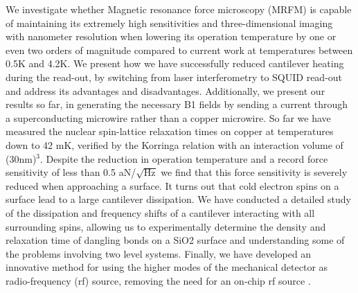 We investigate whether Magnetic resonance force microscopy (MRFM) is capable of maintaining its extremely high sensitivities and three-dimensional imaging with nanometer resolution when lowering its operation temperature by one or even two orders of magnitude compared to current work at temperatures between 0.5K and 4.2K. 
We present how we have successfully reduced cantilever heating during the read-out, by switching from laser interferometry to SQUID read-out and address its advantages and disadvantages. Additionally, we present our results so far, in generating the necessary B1 fields by sending a current through a superconducting microwire rather than a copper microwire. So far we have measured the nuclear spin-lattice relaxation times on copper at temperatures down to 42 mK, verified by the Korringa relation \cite{Wagenaar_2016} with an interaction volume of (30nm)$^3$. 
Despite the reduction in operation temperature and a record force sensitivity of less than 0.5 aN/$\sqrt{\text{Hz}}$ we find that this force sensitivity is severely reduced when approaching a surface. It turns out that cold electron spins on a surface lead to a large cantilever dissipation. We have conducted a detailed study of the dissipation and frequency shifts of a cantilever interacting with all surrounding spins, allowing us to experimentally determine the density and relaxation time of dangling bonds on a SiO2 surface \cite{de_Voogd_2017} and understanding some of the problems involving  two level systems. 
Finally, we have developed an innovative method for using the higher modes of the mechanical detector as radio-frequency (rf) source, removing the need for an on-chip rf source \cite{Wagenaar_2017}.